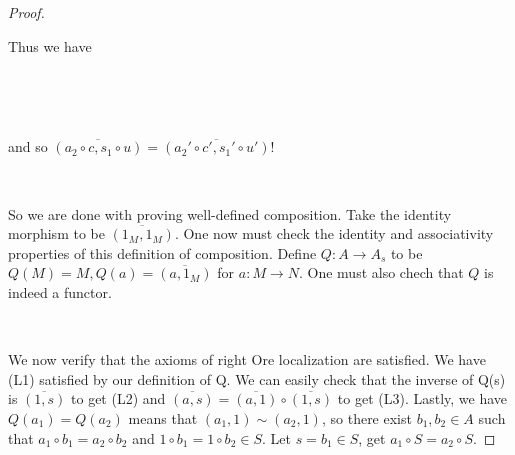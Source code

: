 \documentclass[12pt]{amsart}    %
\theoremstyle{definition}
\begin{document}
\begin{proof}
\

Thus we have

\
\begin{center}
\end{center}

\

 and so $\overline{(a_2 \circ c, s_1 \circ u)} = \overline{(a_2'\circ c', s_1' \circ u')}$! 


\

So we are done with proving well-defined composition.  Take the identity morphism to be $\overline{(1_M,1_M)}$. One now must check the identity and associativity properties of this definition of composition.  Define $Q: A \rightarrow A_s$ to be $Q(M) = M, Q(a) = \overline{(a,1_M)}$ for $a: M \rightarrow N$.  One must also chech that $Q$ is indeed a functor.

\

We now verify that the axioms of right Ore localization are satisfied.  We have (L1) satisfied by our definition of Q.  We can easily check that the inverse of Q(s) is $\overline{(1,s)}$ to get (L2) and $\overline{(a,s)} = \overline{(a,1)}\circ \overline{(1,s)}$ to get (L3).  Lastly, we have $Q(a_1)  = Q(a_2)$ means that $(a_1, 1) \sim (a_2, 1)$, so there exist $b_1, b_2 \in A$ such that $a_1 \circ b_1 = a_2 \circ b_2$ and $1 \circ b_1 = 1 \circ b_2 \in S$.  Let $s = b_1 \in S$, get $a_1 \circ S = a_2 \circ S$.


\end{proof}

\
\end{document}
